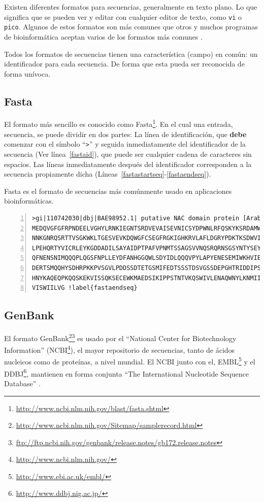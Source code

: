 \documentclass[letter,11pt]{book}
\begin{document}
Existen diferentes formatos para secuencias, generalmente en texto plano. Lo que significa que se pueden ver y editar con cualquier editor de texto, como \Verb+vi+ o \Verb+pico+. Algunos de estos formatos son más comunes que otros y muchos programas de bioinformática aceptan varios de los formatos más comunes \citep{Leonard2007}.

Todos los formatos de secuencias tienen una característica (campo) en común: un identificador para cada secuencia. De forma que esta pueda ser reconocida de forma unívoca.

\subsection{Fasta}

El formato más sencillo es conocido como  Fasta\footnote{\url{http://www.ncbi.nlm.nih.gov/blast/fasta.shtml}}. En el cual una entrada, secuencia, se puede dividir en dos partes: La línea de identificación, que \textbf{debe} comenzar con el símbolo ``\Verb+>+'' y seguida inmediatamente del identificador de la secuencia (Ver línea~\ref{fastaid}), que puede ser cualquier cadena de caracteres sin espacios. Las líneas inmediatamente después del identificador corresponden a la secuencia propiamente dicha (Líneas~\ref{fastastartseq}-\ref{fastaendseq}).

Fasta es el formato de secuencias más comúnmente usado en aplicaciones bioinformáticas.
 
\begin{Verbatim}[commandchars=!\{\},numbers=left,firstnumber=last,label=Secuencia en formato FastA,frame=topline,fontsize=\scriptsize]
>gi|110742030|dbj|BAE98952.1| putative NAC domain protein [Arabidopsis thaliana] !label{fastaid}
MEDQVGFGFRPNDEELVGHYLRNKIEGNTSRDVEVAISEVNICSYDPWNLRFQSKYKSRDAMWYFFSRRE !label{fastastartseq}
NNKGNRQSRTTVSGKWKLTGESVEVKDQWGFCSEGFRGKIGHKRVLAFLDGRYPDKTKSDWVIHEFHYDL
LPEHQRTYVICRLEYKGDDADILSAYAIDPTPAFVPNMTSSAGSVVNQSRQRNSGSYNTYSEYDSANHGQ
QFNENSNIMQQQPLQGSFNPLLEYDFANHGGQWLSDYIDLQQQVPYLAPYENESEMIWKHVIEENFEFLV
DERTSMQQHYSDHRPKKPVSGVLPDDSSDTETGSMIFEDTSSSTDSVGSSDEPGHTRIDDIPSLNIIEPL
HNYKAQEQPKQQSKEKVISSQKSECEWKMAEDSIKIPPSTNTVKQSWIVLENAQWNYLKNMIIGVLLFIS
VISWIILVG !label{fastaendseq}
\end{Verbatim} 

\subsection{GenBank}

El formato GenBank\footnote{\url{http://www.ncbi.nlm.nih.gov/Sitemap/samplerecord.html}}\footnote{\url{ftp://ftp.ncbi.nih.gov/genbank/release.notes/gb172.release.notes}} es usado por el ``National Center for Biotechnology Information'' (NCBI\footnote{\url{http://www.ncbi.nlm.nih.gov/}}), el mayor repositorio de secuencias, tanto de ácidos nucleicos como de proteínas, a nivel mundial. El NCBI junto con el, EMBL\footnote{\url{http://www.ebi.ac.uk/embl/}} y el DDBJ\footnote{\url{http://www.ddbj.nig.ac.jp/}},  mantienen en forma conjunta ``The International Nucleotide Sequence Database'' \citep{Mizrachi2008}.
\end{document}

